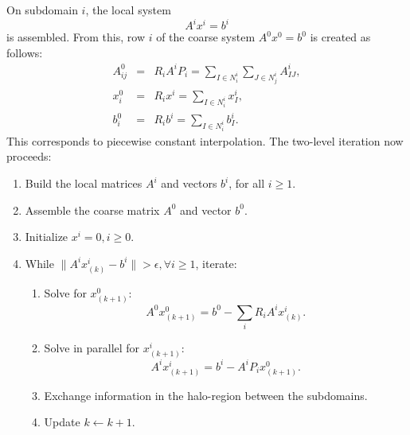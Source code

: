 On subdomain $i$, the local system
\begin{equation}
  A^i x^i = b^i
\end{equation}
is assembled. From this, row $i$ of the coarse system $A^0 x^0 = b^0$
is created as follows:
\begin{eqnarray}
  A_{ij}^0 & = & R_i A^i P_i = \sum_{I\in N_i^i} \sum_{J\in N_j^i} A_{IJ}^i, \\
  x_i^0 & = & R_i x^i = \sum_{I\in N_i^i} x_I^i, \\
  b_i^0 & = & R_i b^i = \sum_{I\in N_i^i} b_I^i.
\end{eqnarray}
This corresponds to piecewise constant interpolation. The two-level
iteration now proceeds:
\begin{enumerate}
\item Build the local matrices $A^i$ and vectors $b^i$, for all $i\geq
  1$.
\item Assemble the coarse matrix $A^0$ and vector $b^0$.
\item Initialize $x^i=0,i\geq 0$.
\item While $\|A^i x_{(k)}^i - b^i\|>\epsilon,\forall i\geq 1$, iterate:
  \begin{enumerate}
  \item Solve for $x_{(k+1)}^0$:
    \begin{equation}
      A^0 x_{(k+1)}^0 = b^0 - \sum_i R_i A^i x_{(k)}^i.
    \end{equation}
  \item Solve in parallel for $x_{(k+1)}^i$:
    \begin{equation}
      A^i x_{(k+1)}^i = b^i - A^i P_i x_{(k+1)}^0.
    \end{equation}
  \item Exchange information in the halo-region between the
    subdomains.
  \item Update $k\leftarrow k+1$.
  \end{enumerate}
\end{enumerate}

